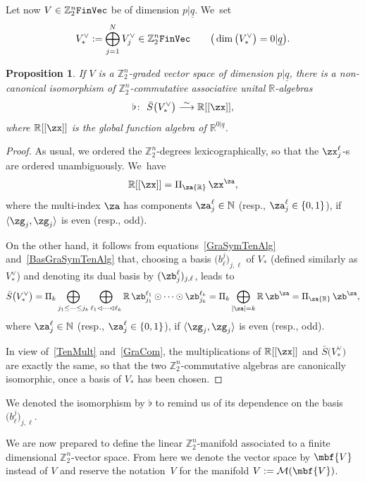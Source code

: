 \documentclass[10pt,a4paper]{amsart}
\newcommand{\op}[1]{\operatorname{#1}}
\newcommand{\R}{{\mathbb R}}
\newcommand{\Z}{{\mathbb Z}}
\def\ul{\underline}
\def\la{\langle}
\def\cM{\cal M}
\def\cM{\mathcal{M}}
\def\ul{\underline}
\newcommand{\0}{\otimes}
\numberwithin{equation}{section}
\newtheorem{Proposition}[Theorem]{Proposition}
 { \theoremstyle{definition}
\newtheorem{Definition}[Theorem]{Definition}
\newtheorem{Example}[Theorem]{Example}
\newtheorem{Remark}[Theorem]{Remark} }
\providecommand{\cal}{\mathcal}
\begin{document}
Let now $V\in\Z_2^n\tt FinVec$ be of dimension $p|\ul q$. We~set
\[
V^\vee_*:=\bigoplus_{j=1}^N V^\vee_{j}\in\Z_2^n{\tt FinVec}\qquad
\big(\op{dim}\big(V^\vee_*\big)=0|\ul q\big).
\]

\begin{Proposition}\label{NonCanIso}
If $V$ is a $\Z_2^n$-graded vector space of dimension $p|\ul q$, there is a non-canonical isomorphism of $\Z_2^n$-commutative associative unital $\R$-algebras
\begin{gather*}%
\flat\colon\ \bar{S}\big(V^\vee_*\big)\stackrel{\sim}{\longrightarrow}\R[[\zx]],
\end{gather*}
where $\R[[\zx]]$ is the global function algebra of $\R^{0|\ul q}$. \end{Proposition}

\begin{proof} As usual, we ordered the $\Z_2^n$-degrees lexicographically, so that the $\zx_j^\ell$-s are ordered unambiguously. We~have
\[
\R[[\zx]]=\Pi_\za\R\,\zx^\za,
\]
where the multi-index $\za$ has components $\za_j^\ell\in\mathbb{N}$ (resp., $\za_j^\ell\in\{0,1\}$), if $\la\zg_j,\zg_j\rangle$ is even (resp., odd).

On the other hand, it follows from equations~\eqref{GraSymTenAlg} and~\eqref{BasGraSymTenAlg} that, choosing a basis $\big(b^j_\ell\big)_{j,\ell}$ of $V_*$ (defined similarly as $V^\vee_*$) and denoting its dual basis by $(\zb^\ell_j)_{j,\ell}$, leads to
\begin{gather}\label{SBarBasis}
\bar S\big(V^\vee_*\big)=\Pi_k\bigoplus_{j_1\le\cdots\le j_k}\bigoplus_{\ell_1\lhd\cdots\lhd \ell_k}\R\,\zb_{j_1}^{\ell_1}\odot\cdots\odot \zb_{j_k}^{\ell_k}=\Pi_k\bigoplus_{|\za|=k}\R\,\zb^\za=\Pi_\za\R\,\zb^\za,
\end{gather}
where $\za_j^\ell\in\mathbb{N}$ (resp., $\za_j^\ell\in\{0,1\}$), if $\la\zg_j,\zg_j\rangle$ is even (resp., odd).

In view of~\eqref{TenMult} and~\eqref{GraCom}, the multiplications of $\R[[\zx]]$ and $\bar S\big(V^\vee_*\big)$ are exactly the same, so that the two $\Z_2^n$-commutative algebras are canonically isomorphic, once a basis of $V_*$ has been chosen.
\end{proof}

\begin{Remark}
We denoted the isomorphism by $\flat$ to remind us of its dependence on the basis~$\big(b^j_\ell\big)_{j,\ell}$.
\end{Remark}

We are now prepared to define the linear $\Z_2^n$-manifold associated to a finite dimensional $\Z_2^n$-vector space. From here we denote the vector space by $\mbf{V}$ instead of $V$ and reserve the notation~$V$ for the manifold $V:=\cM(\mbf{V})$.
\end{document}
